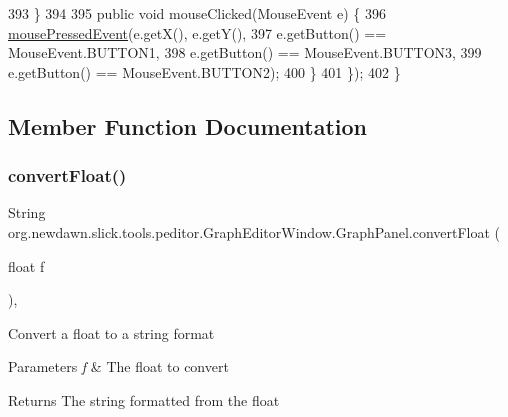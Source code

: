 \begin{DoxyCode}
393                 \}
394 
395                 \textcolor{keyword}{public} \textcolor{keywordtype}{void} mouseClicked(MouseEvent e) \{
396                     \mbox{\hyperlink{classorg_1_1newdawn_1_1slick_1_1tools_1_1peditor_1_1_graph_editor_window_1_1_graph_panel_a94facf1f29f716b1c9fe191072ec7a75}{mousePressedEvent}}(e.getX(), e.getY(),
397                             e.getButton() == MouseEvent.BUTTON1,
398                             e.getButton() == MouseEvent.BUTTON3,
399                             e.getButton() == MouseEvent.BUTTON2);
400                 \}
401             \});
402         \}
\end{DoxyCode}


\subsection{Member Function Documentation}
\mbox{\label{classorg_1_1newdawn_1_1slick_1_1tools_1_1peditor_1_1_graph_editor_window_1_1_graph_panel_acd99b7572a8b9950eb701f306914eb3c}} 
\subsubsection{\texorpdfstring{convert\+Float()}{convertFloat()}}
{\footnotesize\ttfamily String org.\+newdawn.\+slick.\+tools.\+peditor.\+Graph\+Editor\+Window.\+Graph\+Panel.\+convert\+Float (\begin{DoxyParamCaption}\item[{float}]{f }\end{DoxyParamCaption})\hspace{0.3cm}{\ttfamily [inline]}, {\ttfamily [private]}}

Convert a float to a string format


\begin{DoxyParams}{Parameters}
{\em f} & The float to convert \\
\hline
\end{DoxyParams}
\begin{DoxyReturn}{Returns}
The string formatted from the float 
\end{DoxyReturn}

